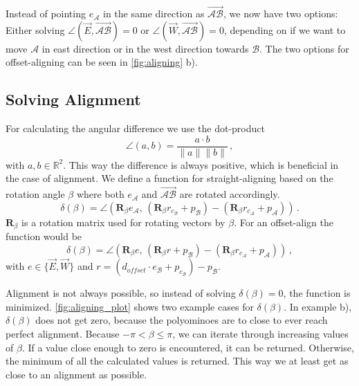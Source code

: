 Instead of pointing $e_\mathcal{A}$ in the same direction as $\overrightarrow{\mathcal{A}\mathcal{B}}$, we now have two options:
Either solving $\angle \left( \vec{E}, \overrightarrow{\mathcal{A}\mathcal{B}} \right) = 0$ or $\angle \left( \vec{W}, \overrightarrow{\mathcal{A}\mathcal{B}} \right) = 0$, depending on if we want to move $\mathcal{A}$ in east direction or in the west direction towards $\mathcal{B}$.
The two options for offset-aligning can be seen in \autoref{fig:aligning} b).

\subsection{Solving Alignment}

For calculating the angular difference we use the dot-product
\begin{equation*}
\angle (a,b) = \frac{a \cdot b}{\lVert a \rVert \lVert b \rVert} \,,
\end{equation*}
with $a,b \in \mathbb{R}^2$. This way the difference is always positive, which is beneficial in the case of alignment.
We define a function for straight-aligning based on the rotation angle $\beta$ where both $e_\mathcal{A}$ and $\overrightarrow{\mathcal{A}\mathcal{B}}$ are rotated accordingly.
\begin{equation}
\delta(\beta) = \angle \left( \mathbf{R}_\beta e_\mathcal{A}, \, \left( \mathbf{R}_\beta r_{c_\mathcal{B}} + p_\mathcal{B} \right) - \left( \mathbf{R}_\beta r_{c_\mathcal{A}} + p_\mathcal{A} \right)\right) \,.
\end{equation}
$\mathbf{R}_\beta$ is a rotation matrix used for rotating vectors by $\beta$.
For an offset-align the function would be
\begin{equation}
\delta(\beta) = \angle \left( \mathbf{R}_\beta e, \, \left( \mathbf{R}_\beta r + p_\mathcal{B} \right) - \left( \mathbf{R}_\beta r_{c_\mathcal{A}} + p_\mathcal{A} \right)\right) \,,
\end{equation}
with $e \in \{ \vec{E}, \vec{W}\}$ and $r = \left( d_\textit{offset} \cdot e_\mathcal{B} + p_{c_\mathcal{B}} \right) - p_\mathcal{B}$.

Alignment is not always possible, so instead of solving $\delta(\beta) = 0$, the function is minimized.
\autoref{fig:aligning_plot} shows two example cases for $\delta(\beta)$.
In example b), $\delta(\beta)$ does not get zero, because the polyominoes are to close to ever reach perfect alignment.
Because $-\pi < \beta \leq \pi$, we can iterate through increasing values of $\beta$.
If a value close enough to zero is encountered, it can be returned.
Otherwise, the minimum of all the calculated values is returned.
This way we at least get as close to an alignment as possible.



